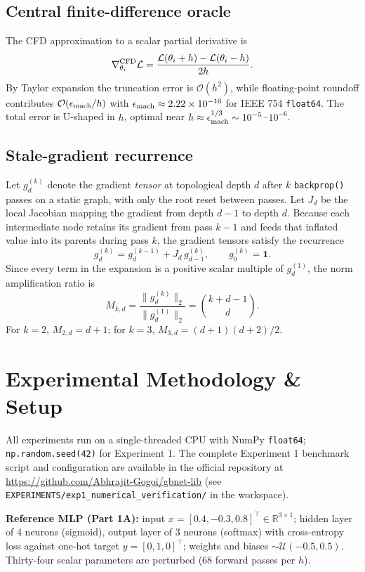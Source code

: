\documentclass[11pt,a4paper]{article}
\begin{document}
\subsection{Central finite-difference oracle}
The CFD approximation to a scalar partial derivative is
\[
\nabla_{\theta_i}^{\rm CFD}\mathcal{L} = \frac{\mathcal{L}(\theta_i+h) - \mathcal{L}(\theta_i-h)}{2h}.
\]
By Taylor expansion the truncation error is $\mathcal{O}(h^2)$, while floating-point roundoff contributes $\mathcal{O}(\epsilon_{\rm mach}/h)$ with $\epsilon_{\rm mach} \approx 2.22\times10^{-16}$ for IEEE 754 \texttt{float64}. The total error is U-shaped in $h$, optimal near $h \approx \epsilon_{\rm mach}^{1/3} \sim 10^{-5}$--$10^{-6}$.

\subsection{Stale-gradient recurrence}
Let $g_d^{(k)}$ denote the gradient \emph{tensor} at topological depth $d$ after $k$ \texttt{backprop()} passes on a static graph, with only the root reset between passes. Let $J_d$ be the local Jacobian mapping the gradient from depth $d-1$ to depth $d$. Because each intermediate node retains its gradient from pass $k-1$ and feeds that inflated value into its parents during pass $k$, the gradient tensors satisfy the recurrence
\[
g_d^{(k)} = g_d^{(k-1)} + J_d\,g_{d-1}^{(k)},
\qquad
g_0^{(k)} = \mathbf{1}.
\]
Since every term in the expansion is a positive scalar multiple of $g_d^{(1)}$, the norm amplification ratio is
\[
M_{k,d} = \frac{\|g_d^{(k)}\|_2}{\|g_d^{(1)}\|_2} = \binom{k+d-1}{d}.
\]
For $k=2$, $M_{2,d} = d+1$; for $k=3$, $M_{3,d} = (d+1)(d+2)/2$.

\section{Experimental Methodology \& Setup}

All experiments run on a single-threaded CPU with NumPy \texttt{float64}; \texttt{np.random.seed(42)} for Experiment 1. The complete Experiment 1 benchmark script and configuration are available in the official repository at \url{https://github.com/Abhrajit-Gogoi/gbnet-lib} (see \texttt{EXPERIMENTS/exp1\_numerical\_verification/} in the workspace).

\textbf{Reference MLP (Part 1A):} input $x=[0.4,-0.3,0.8]^\top \in \mathbb{R}^{3\times 1}$; hidden layer of 4 neurons (sigmoid), output layer of 3 neurons (softmax) with cross-entropy loss against one-hot target $y=[0,1,0]^\top$; weights and biases $\sim\mathcal{U}(-0.5,0.5)$. Thirty-four scalar parameters are perturbed ($68$ forward passes per $h$).
\end{document}
